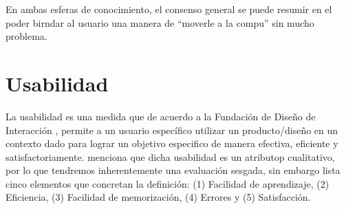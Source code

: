 En ambas esferas de conocimiento, el consenso general se puede resumir en el poder birndar al usuario una
manera de ``moverle a la compu'' sin mucho problema.

\section{Usabilidad}
La usabilidad es una medida que de acuerdo a la Fundación de Diseño de Interacción \cite{unknown-author-no-dateC}, %
permite a un usuario específico utilizar un producto/diseño en un contexto dado para lograr
un objetivo especifico de manera efectiva, eficiente y satisfactoriamente. \cite{unknown-author-no-dateB} menciona %
que dicha usabilidad es un atributop cualitativo, por lo que tendremos inherentemente una
evaluación sesgada, sin embargo lista cinco elementos que concretan la definición:
(1) Facilidad de aprendizaje, (2) Eficiencia, (3) Facilidad de memorización, (4) Errores 
y (5) Satisfacción.
\\

